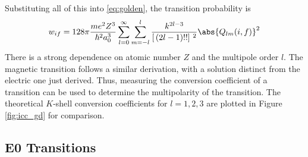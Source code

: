 Substituting all of this into \ref{eq:golden}, the transition probability is
\begin{equation}
    w_{if}=128\pi\frac{me^2Z^3}{\hbar^2a_0^3} \sum_{l=0}^\infty\sum_{m=-l}^{l} \frac{k^{2l-3}}{\left[\,(2l-1)!!\right]\,^2}\abs{Q_{lm}(i,f)}^2
\end{equation}
There is a strong dependence on atomic number $Z$ and the multipole order $l$. The magnetic transition follows a similar derivation, with a solution distinct from the electric one just derived. Thus, measuring the conversion coefficient of a transition can be used to determine the multipolarity of the transition. The theoretical $K$-shell conversion coefficients for $l=1,2,3$ are plotted in Figure \ref{fig:icc_gd} for comparison.

\subsection{E0 Transitions}
\label{sec:E0}

